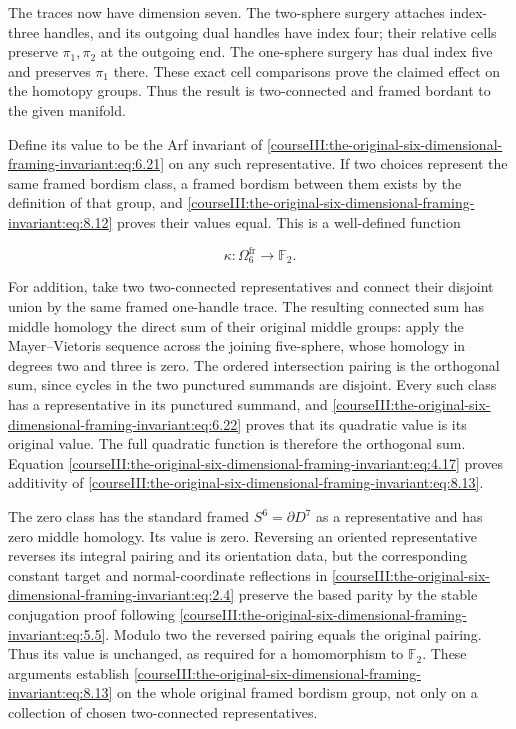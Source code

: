The traces now have dimension seven. The two-sphere surgery attaches index-three handles, and its outgoing dual handles have index four; their relative cells preserve \(\pi_1,\pi_2\) at the outgoing end. The one-sphere surgery has dual index five and preserves \(\pi_1\) there. These exact cell comparisons prove the claimed effect on the homotopy groups. Thus the result is two-connected and framed bordant to the given manifold.

Define its value to be the Arf invariant of \eqref{courseIII:the-original-six-dimensional-framing-invariant:eq:6.21} on any such representative. If two choices represent the same framed bordism class, a framed bordism between them exists by the definition of that group, and \eqref{courseIII:the-original-six-dimensional-framing-invariant:eq:8.12} proves their values equal. This is a well-defined function

\begin{equation}
\kappa:\Omega^{\mathrm{fr}}_6\longrightarrow\mathbb F_2.
 \label{courseIII:the-original-six-dimensional-framing-invariant:eq:8.13}
\end{equation}

For addition, take two two-connected representatives and connect their disjoint union by the same framed one-handle trace. The resulting connected sum has middle homology the direct sum of their original middle groups: apply the Mayer--Vietoris sequence across the joining five-sphere, whose homology in degrees two and three is zero. The ordered intersection pairing is the orthogonal sum, since cycles in the two punctured summands are disjoint. Every such class has a representative in its punctured summand, and \eqref{courseIII:the-original-six-dimensional-framing-invariant:eq:6.22} proves that its quadratic value is its original value. The full quadratic function is therefore the orthogonal sum. Equation \eqref{courseIII:the-original-six-dimensional-framing-invariant:eq:4.17} proves additivity of \eqref{courseIII:the-original-six-dimensional-framing-invariant:eq:8.13}.

The zero class has the standard framed \(S^6=\partial D^7\) as a representative and has zero middle homology. Its value is zero. Reversing an oriented representative reverses its integral pairing and its orientation data, but the corresponding constant target and normal-coordinate reflections in \eqref{courseIII:the-original-six-dimensional-framing-invariant:eq:2.4} preserve the based parity by the stable conjugation proof following \eqref{courseIII:the-original-six-dimensional-framing-invariant:eq:5.5}. Modulo two the reversed pairing equals the original pairing. Thus its value is unchanged, as required for a homomorphism to \(\mathbb F_2\). These arguments establish \eqref{courseIII:the-original-six-dimensional-framing-invariant:eq:8.13} on the whole original framed bordism group, not only on a collection of chosen two-connected representatives.

